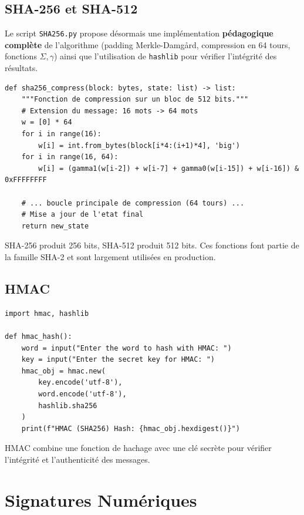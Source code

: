 \documentclass[12pt,a4paper]{report}
\begin{document}
\section{SHA-256 et SHA-512}
Le script \texttt{SHA256.py} propose désormais une implémentation \textbf{pédagogique complète} de l'algorithme (padding Merkle-Damgård, compression en 64 tours, fonctions $\Sigma, \gamma$) ainsi que l'utilisation de \texttt{hashlib} pour vérifier l'intégrité des résultats.

\begin{lstlisting}[style=python,caption=SHA256.py - Algorithme de compression manuel]
def sha256_compress(block: bytes, state: list) -> list:
    """Fonction de compression sur un bloc de 512 bits."""
    # Extension du message: 16 mots -> 64 mots
    w = [0] * 64
    for i in range(16):
        w[i] = int.from_bytes(block[i*4:(i+1)*4], 'big')
    for i in range(16, 64):
        w[i] = (gamma1(w[i-2]) + w[i-7] + gamma0(w[i-15]) + w[i-16]) & 0xFFFFFFFF
    
    # ... boucle principale de compression (64 tours) ...
    # Mise a jour de l'etat final
    return new_state
\end{lstlisting}
SHA-256 produit 256 bits, SHA-512 produit 512 bits. Ces fonctions font partie de la famille SHA-2 et sont largement utilisées en production.

\section{HMAC}
\begin{lstlisting}[style=python,caption=HMAC.py]
import hmac, hashlib

def hmac_hash():
    word = input("Enter the word to hash with HMAC: ")
    key = input("Enter the secret key for HMAC: ")
    hmac_obj = hmac.new(
        key.encode('utf-8'),
        word.encode('utf-8'),
        hashlib.sha256
    )
    print(f"HMAC (SHA256) Hash: {hmac_obj.hexdigest()}")
\end{lstlisting}
HMAC combine une fonction de hachage avec une clé secrète pour vérifier l'intégrité et l'authenticité des messages.

\chapter{Signatures Numériques}
\end{document}
